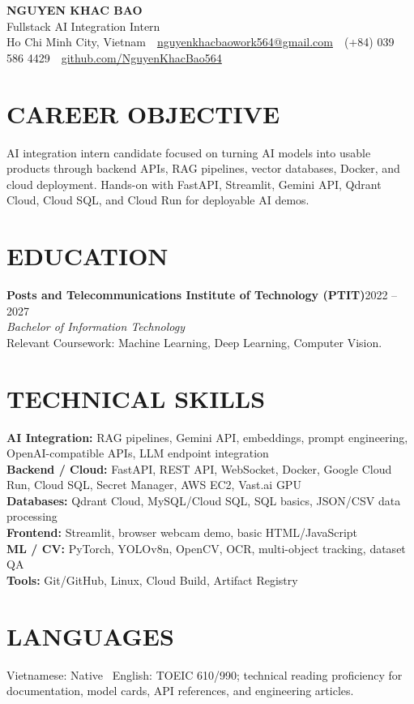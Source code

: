 \documentclass[10pt,a4paper]{article}
\newcommand{\entryhead}[2]{%
    \noindent\textbf{#1}\hfill #2\\[-2pt]
}
\newcommand{\entrysub}[1]{%
    \noindent\textit{#1}\\[-1pt]
}
\begin{document}
\fontsize{9.05}{10.0}\selectfont

\begin{center}
    {\Large\textbf{NGUYEN KHAC BAO}}\\[-1pt]
    Fullstack AI Integration Intern\\[2pt]
    Ho Chi Minh City, Vietnam
    \,\textbar\,
    \href{mailto:nguyenkhacbaowork564@gmail.com}{nguyenkhacbaowork564@gmail.com}
    \,\textbar\,
    (+84) 039 586 4429
    \,\textbar\,
    \href{https://github.com/NguyenKhacBao564}{github.com/NguyenKhacBao564}
\end{center}

\section{CAREER OBJECTIVE}
AI integration intern candidate focused on turning AI models into usable products through backend APIs, RAG pipelines, vector databases, Docker, and cloud deployment. Hands-on with FastAPI, Streamlit, Gemini API, Qdrant Cloud, Cloud SQL, and Cloud Run for deployable AI demos.

\section{EDUCATION}
\entryhead{Posts and Telecommunications Institute of Technology (PTIT)}{2022 -- 2027}
\entrysub{Bachelor of Information Technology}
Relevant Coursework: Machine Learning, Deep Learning, Computer Vision.

\section{TECHNICAL SKILLS}
\textbf{AI Integration:} RAG pipelines, Gemini API, embeddings, prompt engineering, OpenAI-compatible APIs, LLM endpoint integration\\
\textbf{Backend / Cloud:} FastAPI, REST API, WebSocket, Docker, Google Cloud Run, Cloud SQL, Secret Manager, AWS EC2, Vast.ai GPU\\
\textbf{Databases:} Qdrant Cloud, MySQL/Cloud SQL, SQL basics, JSON/CSV data processing\\
\textbf{Frontend:} Streamlit, browser webcam demo, basic HTML/JavaScript\\
\textbf{ML / CV:} PyTorch, YOLOv8n, OpenCV, OCR, multi-object tracking, dataset QA\\
\textbf{Tools:} Git/GitHub, Linux, Cloud Build, Artifact Registry

\section{LANGUAGES}
Vietnamese: Native \textbar\ English: TOEIC 610/990; technical reading proficiency for documentation, model cards, API references, and engineering articles.
\end{document}
